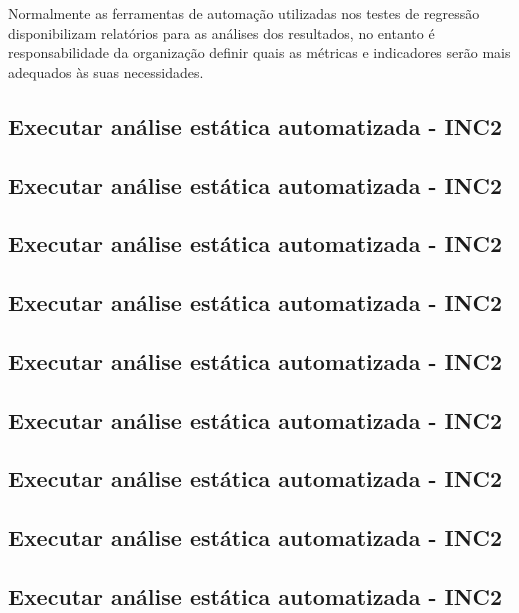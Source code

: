Normalmente as ferramentas de automação utilizadas nos testes de regressão disponibilizam relatórios para as análises dos resultados, no entanto é responsabilidade da organização definir quais as métricas e indicadores serão mais adequados às suas necessidades.



\subsection{Executar análise estática automatizada - INC2}

\subsection{Executar análise estática automatizada - INC2}

\subsection{Executar análise estática automatizada - INC2}

\subsection{Executar análise estática automatizada - INC2}


\subsection{Executar análise estática automatizada - INC2}

\subsection{Executar análise estática automatizada - INC2}

\subsection{Executar análise estática automatizada - INC2}

\subsection{Executar análise estática automatizada - INC2}

\subsection{Executar análise estática automatizada - INC2}

